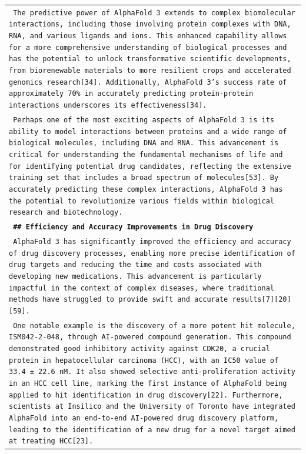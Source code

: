 \begin{longtable}{p{\textwidth}}
\texttt{\small{ The predictive power of AlphaFold 3 extends to complex biomolecular interactions, including those involving protein complexes with DNA, RNA, and various ligands and ions. This enhanced capability allows for a more comprehensive understanding of biological processes and has the potential to unlock transformative scientific developments, from biorenewable materials to more resilient crops and accelerated genomics research[34]. Additionally, AlphaFold 3's success rate of approximately 70\% in accurately predicting protein-protein interactions underscores its effectiveness[34]. }} \\
\texttt{\small{ Perhaps one of the most exciting aspects of AlphaFold 3 is its ability to model interactions between proteins and a wide range of biological molecules, including DNA and RNA. This advancement is critical for understanding the fundamental mechanisms of life and for identifying potential drug candidates, reflecting the extensive training set that includes a broad spectrum of molecules[53]. By accurately predicting these complex interactions, AlphaFold 3 has the potential to revolutionize various fields within biological research and biotechnology. }} \\
\vspace{1pt}
\texttt{\small{\textbf{ \#\# Efficiency and Accuracy Improvements in Drug Discovery }}} \\
\texttt{\small{ AlphaFold 3 has significantly improved the efficiency and accuracy of drug discovery processes, enabling more precise identification of drug targets and reducing the time and costs associated with developing new medications. This advancement is particularly impactful in the context of complex diseases, where traditional methods have struggled to provide swift and accurate results[7][20][59]. }} \\
\texttt{\small{ One notable example is the discovery of a more potent hit molecule, ISM042-2-048, through AI-powered compound generation. This compound demonstrated good inhibitory activity against CDK20, a crucial protein in hepatocellular carcinoma (HCC), with an IC50 value of 33.4 ± 22.6 nM. It also showed selective anti-proliferation activity in an HCC cell line, marking the first instance of AlphaFold being applied to hit identification in drug discovery[22]. Furthermore, scientists at Insilico and the University of Toronto have integrated AlphaFold into an end-to-end AI-powered drug discovery platform, leading to the identification of a new drug for a novel target aimed at treating HCC[23]. }} \\

\end{longtable}
